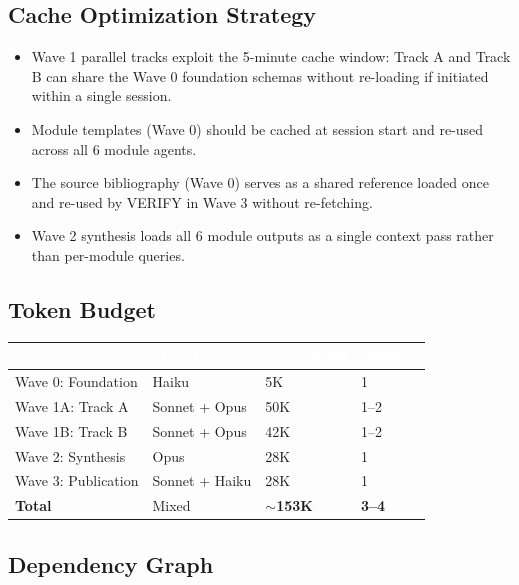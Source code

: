 \documentclass[11pt,letterpaper]{article}
\newcommand{\tableheader}[1]{\textbf{\sffamily\textcolor{white}{#1}}}
\begin{document}
\subsection{Cache Optimization Strategy}

\begin{itemize}[noitemsep]
  \item Wave 1 parallel tracks exploit the 5-minute cache window: Track A and Track B can share the Wave 0 foundation schemas without re-loading if initiated within a single session.
  \item Module templates (Wave 0) should be cached at session start and re-used across all 6 module agents.
  \item The source bibliography (Wave 0) serves as a shared reference loaded once and re-used by VERIFY in Wave 3 without re-fetching.
  \item Wave 2 synthesis loads all 6 module outputs as a single context pass rather than per-module queries.
\end{itemize}

\subsection{Token Budget}

\begin{center}
\begin{tabularx}{\textwidth}{L{3.5cm}C{2cm}C{2cm}C{2cm}}
\toprule
{}
\tableheader{Wave} & \tableheader{Model} & \tableheader{Est. Tokens} & \tableheader{Sessions} \\
\midrule
Wave 0: Foundation & Haiku & 5K & 1 \\
Wave 1A: Track A & Sonnet + Opus & 50K & 1--2 \\
Wave 1B: Track B & Sonnet + Opus & 42K & 1--2 \\
Wave 2: Synthesis & Opus & 28K & 1 \\
Wave 3: Publication & Sonnet + Haiku & 28K & 1 \\
\midrule
\textbf{Total} & Mixed & \textbf{$\sim$153K} & \textbf{3--4} \\
\bottomrule
\end{tabularx}
\end{center}

\subsection{Dependency Graph}
\end{document}
